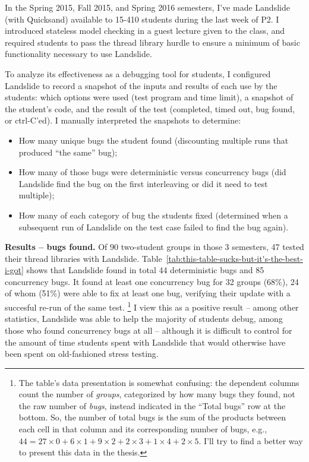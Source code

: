 In the Spring 2015, Fall 2015, and Spring 2016 semesters,
I've made Landslide (with Quicksand) available to 15-410 students during the last week of P2.
I introduced stateless model checking in a guest lecture given to the class,
and required students to pass the thread library hurdle \cite{thrlib}
to ensure a minimum of basic functionality necessary to use Landslide.

To analyze its effectiveness as a debugging tool for students,
I configured Landslide to record a snapshot of the inputs and results of each use by the students:
which options were used (test program and time limit),
a snapshot of the student's code, and the result of the test
(completed, timed out, bug found, or ctrl-C'ed).
I manually interpreted the snapshots to determine:
\begin{itemize}
	\item How many unique bugs the student found (discounting multiple runs that produced ``the same'' bug);
	\item How many of those bugs were deterministic versus concurrency bugs (did Landslide find the bug on the first interleaving or did it need to test multiple);
	\item How many of each category of bug the students fixed (determined when a subsequent run of Landslide on the test case failed to find the bug again).
\end{itemize}

{\bf Results -- bugs found.}
Of 90 two-student groups in those 3 semesters, 47 tested their thread libraries with Landslide.
Table~\ref{tab:this-table-sucks-but-it's-the-best-i-got} shows
that Landslide found in total 44 deterministic bugs and 85 concurrency bugs.
It found at least one concurrency bug for 32 groups (68\%),
24 of whom (51\%) were able to fix at least one bug, verifying their update
with a succesful re-run of the same test.
\footnote{The table's data presentation is somewhat confusing:
the dependent columns count the number of {\em groups}, categorized by how many bugs they found, not the raw number of {\em bugs},
instead indicated in the ``Total bugs'' row at the bottom.
So, the number of total bugs is the sum of the products between each cell in that column and its corresponding number of bugs,
e.g., $44 = 27\times0 + 6\times1 + 9\times2 + 2\times3 + 1\times4 + 2\times5$.
I'll try to find a better way to present this data in the thesis.}
I view this as a positive result -- among other statistics, Landslide was able to help the majority of students debug, among those who found concurrency bugs at all -- although it is difficult to control for the amount of time students spent with Landslide that would otherwise have been spent on old-fashioned stress testing.

